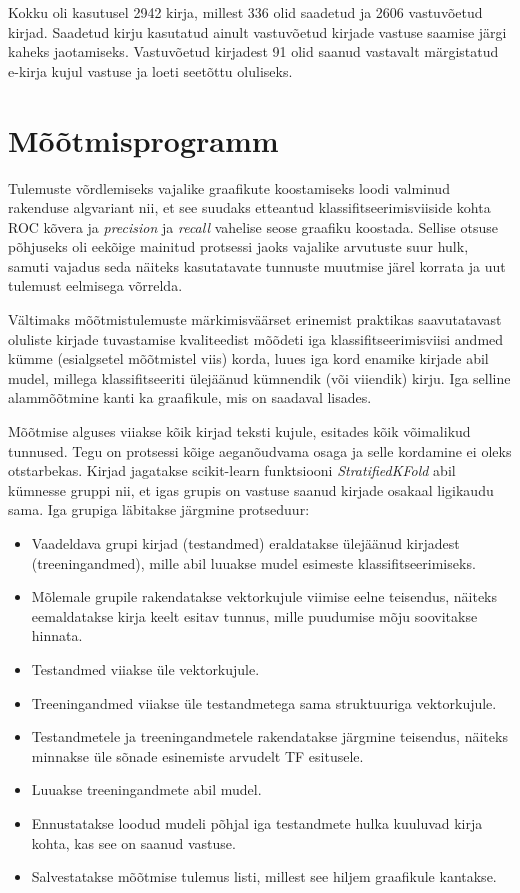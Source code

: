 \documentclass[]{trkuur}
\let\eng\emph
\let\enp\eng
\begin{document}
Kokku oli kasutusel 2942 kirja, millest 336 olid saadetud ja 2606
vastuvõetud kirjad. Saadetud kirju kasutatud ainult vastuvõetud kirjade vastuse saamise järgi kaheks jaotamiseks.
Vastuvõetud kirjadest 91 olid saanud vastavalt märgistatud e-kirja kujul vastuse ja loeti seetõttu oluliseks.

\section{Mõõtmisprogramm}
Tulemuste võrdlemiseks vajalike graafikute koostamiseks loodi valminud rakenduse
algvariant nii, et see suudaks etteantud klassifitseerimisviiside kohta
ROC kõvera ja \eng{precision} ja \eng{recall} vahelise seose graafiku koostada.
Sellise otsuse põhjuseks oli eekõige mainitud protsessi jaoks vajalike arvutuste
suur hulk, samuti vajadus seda näiteks kasutatavate tunnuste muutmise järel
korrata ja uut tulemust eelmisega võrrelda.

Vältimaks mõõtmistulemuste märkimisväärset erinemist praktikas saavutatavast
oluliste kirjade tuvastamise kvaliteedist mõõdeti iga klassifitseerimisviisi
andmed kümme (esialgsetel mõõtmistel viis) korda, luues iga kord enamike kirjade abil mudel,
millega klassifitseeriti ülejäänud kümnendik (või viiendik) kirju. Iga selline alammõõtmine
kanti ka graafikule, mis on saadaval lisades.

Mõõtmise alguses viiakse kõik kirjad teksti kujule, esitades kõik võimalikud
tunnused. Tegu on protsessi kõige aeganõudvama osaga ja selle kordamine ei
oleks otstarbekas. \label{howmeasure}
Kirjad jagatakse scikit-learn funktsiooni \enp{StratifiedKFold} abil kümnesse
gruppi nii, et igas grupis on vastuse saanud kirjade osakaal ligikaudu sama.
Iga grupiga läbitakse järgmine protseduur:
\begin{itemize}
    \item Vaadeldava grupi kirjad (testandmed) eraldatakse ülejäänud kirjadest (treeningandmed),
        mille abil luuakse mudel esimeste klassifitseerimiseks.
    \item Mõlemale grupile rakendatakse vektorkujule viimise eelne teisendus,
        näiteks eemaldatakse kirja keelt esitav tunnus, mille puudumise mõju soovitakse hinnata.
    \item Testandmed viiakse üle vektorkujule.
    \item Treeningandmed viiakse üle testandmetega sama struktuuriga vektorkujule.
    \item Testandmetele ja treeningandmetele rakendatakse järgmine teisendus,
        näiteks minnakse üle sõnade esinemiste arvudelt TF esitusele.
    \item Luuakse treeningandmete abil mudel.
    \item Ennustatakse loodud mudeli põhjal iga testandmete hulka kuuluvad
        kirja kohta, kas see on saanud vastuse.
    \item Salvestatakse mõõtmise tulemus listi, millest see hiljem graafikule kantakse.
\end{itemize}
\end{document}
